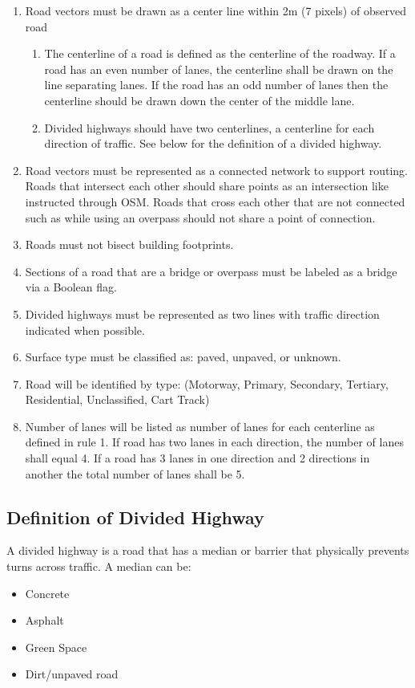 \documentclass{article}
\begin{document}
\begin{enumerate}
	\item Road vectors must be drawn as a center line within 2m (7 pixels) of observed road
	\begin{enumerate}
		\item The centerline of a road is defined as the centerline of the roadway. If a road has an even number of lanes, the centerline shall be drawn on the line separating lanes.  If the road has an odd number of lanes then the centerline should be drawn down the center of the middle lane.  
		\item Divided highways should have two centerlines, a centerline for each direction of traffic.  See below for the definition of a divided highway. 
	\end{enumerate}
	\item Road vectors must be represented as a connected network to support routing.  Roads that intersect each other should share points as an intersection like instructed through OSM.  Roads that cross each other that are not connected such as while using an overpass should not share a point of connection.
	\item Roads must not bisect building footprints.
	\item Sections of a road that are a bridge or overpass must be labeled as a bridge via a Boolean flag.  
	\item Divided highways must be represented as two lines with traffic direction indicated when possible.
	\item Surface type must be classified as:  paved, unpaved, or unknown. 
	\item Road will be identified by type: (Motorway, Primary, Secondary, Tertiary, Residential, Unclassified, Cart Track)
	\item Number of lanes will be listed as number of lanes for each centerline as defined in rule 1.  If road has two lanes in each direction, the number of lanes shall equal 4.  If a road has 3 lanes in one direction and 2 directions in another the total number of lanes shall be 5.  
\end{enumerate}


\subsection{Definition of Divided Highway}

A divided highway is a road that has a median or barrier that physically prevents turns across traffic.  
A median can be:
\begin{itemize}
	\item Concrete
	\item Asphalt
	\item Green Space
	\item Dirt/unpaved road
\end{itemize}
\end{document}

